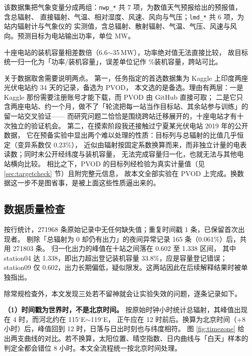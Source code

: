 \documentclass[11pt,a4paper]{ctexart}
\begin{document}
该数据集把气象变量分成两组：\texttt{nwp\_*} 共 7 项，为数值天气预报给出的预报值，含总辐射、
直接辐射、气温、相对湿度、风速、风向与气压；\texttt{lmd\_*} 共 6 项，为站内辐射计与气象仪的
实测值，含总辐射、散射辐射、气温、气压、风速与风向。预测目标为电站输出功率，单位 MW。

十座电站的装机容量相差数倍（6.6$\sim$35\,MW），功率绝对值无法直接比较，
故目标统一归一化为「功率/装机容量」，误差单位记作 \%装机容量，跨站可比。

关于数据取舍需要说明两点。
第一，任务指定的首选数据集为 Kaggle 上印度两座光伏电站约 34 天的记录，备选为 PVOD，
本文选的是备选。理由有两层：一是 Kaggle 那份需要注册账号才能下载，而 PVOD 由 GitHub 直接可取；
二是它只含两座电站、约一个月，做不了「轮流把每一站当作目标站、其余站参与训练」的留一站交叉验证——
而研究问题二恰恰是围绕跨站迁移展开的，十座电站才有十次独立的验证机会。
第二，在摸索阶段我还接触过宁夏某光伏电站 2019 年的公开数据\cite{ningxia2019photovoltaic}，
它在预备实验中显出两个难以处理的性质：目标列与总辐射的比值几乎恒定（变异系数仅 0.23\%），
近似由辐射按固定系数换算而来，而非独立计量的电表读数；同时未公开经纬度与装机容量，
无法完成容量归一化，也就无法与其他电站横向比较。
相比之下，PVOD 的目标列经检验为真实计量值（见 \ref{sec:targetcheck} 节）且附完整元信息，
故本文全部实验在 PVOD 上完成。换数据这一步不是图省事，是被上面这些性质逼出来的。

\subsection{数据质量检查}
\label{sec:quality}

按行统计，271968 条原始记录中无任何缺失值；重复时间戳 1 条，已保留首次出现者。
剔除「总辐射为 0 却仍有出力」的夜间异常记录 165 条（0.061\%）后，共用 271803 条。
归一化出力的峰值在十站之间落在 0.602 至 1.338 区间，
其中 station04 达 1.338，即出力超出登记装机容量 33.8\%，应是容量登记错误；
station09 仅 0.602，出力长期偏低，疑似限发。这两站因此在后续解释结果时被单独指出。

除常规检查外，本文发现三处若不留神就会让实验失效的问题，逐条记录如下。

\textbf{（1）时间戳为世界时，不是北京时间。}
按原始时钟小时统计总辐射，其峰值出现在 4 时，而河北约在 115$^\circ$E$\sim$119$^\circ$E，
正午应在 12 时前后。换算为北京时间（+8 小时）后，峰值回到 12 时，日落与日出时刻也与纬度相符。
图 \ref{fig:timezone} 给出两支曲线的对比。若不换算，太阳位置、晴空指数、日内曲线与「白天」样本的
判定全都会错位 8 小时。本文全流程统一按北京时间处理。
\end{document}
